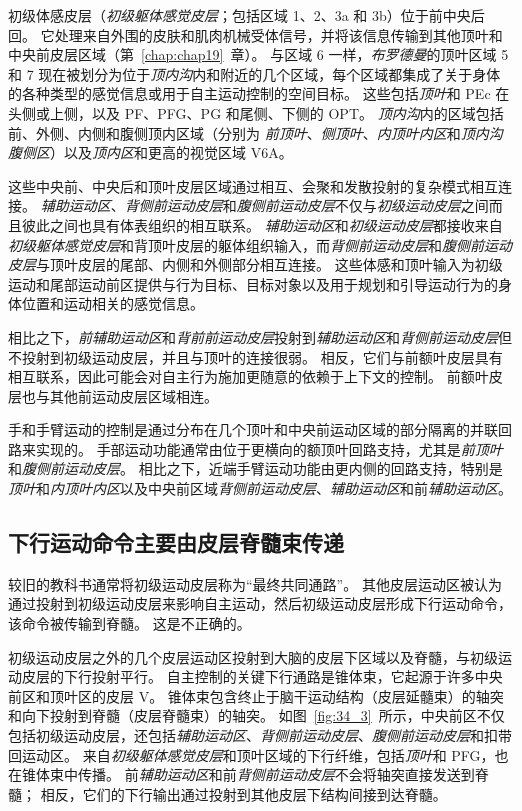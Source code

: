 初级体感皮层（\textit{初级躯体感觉皮层}；包括区域 1、2、3a 和 3b）位于前中央后回。
它处理来自外围的皮肤和肌肉机械受体信号，并将该信息传输到其他顶叶和中央前皮层区域（第~\ref{chap:chap19}~章）。
与区域 6 一样，\textit{布罗德曼}的顶叶区域 5 和 7 现在被划分为位于\textit{顶内沟}内和附近的几个区域，每个区域都集成了关于身体的各种类型的感觉信息或用于自主运动控制的空间目标。
这些包括\textit{顶叶}和 PEc 在头侧或上侧，以及 PF、PFG、PG 和尾侧、下侧的 OPT。
\textit{顶内沟}内的区域包括前、外侧、内侧和腹侧顶内区域（分别为 \textit{前顶叶}、\textit{侧顶叶}、\textit{内顶叶内区}和\textit{顶内沟腹侧区}）以及\textit{顶内区}和更高的视觉区域 V6A。


这些中央前、中央后和顶叶皮层区域通过相互、会聚和发散投射的复杂模式相互连接。
\textit{辅助运动区}、\textit{背侧前运动皮层}和\textit{腹侧前运动皮层}不仅与\textit{初级运动皮层}之间而且彼此之间也具有体表组织的相互联系。
\textit{辅助运动区}和\textit{初级运动皮层}都接收来自\textit{初级躯体感觉皮层}和背顶叶皮层的躯体组织输入，而\textit{背侧前运动皮层}和\textit{腹侧前运动皮层}与顶叶皮层的尾部、内侧和外侧部分相互连接。
这些体感和顶叶输入为初级运动和尾部运动前区提供与行为目标、目标对象以及用于规划和引导运动行为的身体位置和运动相关的感觉信息。


相比之下，\textit{前辅助运动区}和\textit{背前前运动皮层}投射到\textit{辅助运动区}和\textit{背侧前运动皮层}但不投射到初级运动皮层，并且与顶叶的连接很弱。
相反，它们与前额叶皮层具有相互联系，因此可能会对自主行为施加更随意的依赖于上下文的控制。
前额叶皮层也与其他前运动皮层区域相连。


手和手臂运动的控制是通过分布在几个顶叶和中央前运动区域的部分隔离的并联回路来实现的。
手部运动功能通常由位于更横向的额顶叶回路支持，尤其是\textit{前顶叶}和\textit{腹侧前运动皮层}。
相比之下，近端手臂运动功能由更内侧的回路支持，特别是\textit{顶叶}和\textit{内顶叶内区}以及中央前区域\textit{背侧前运动皮层}、\textit{辅助运动区}和前\textit{辅助运动区}。



\subsection{下行运动命令主要由皮层脊髓束传递}

较旧的教科书通常将初级运动皮层称为“最终共同通路”。
其他皮层运动区被认为通过投射到初级运动皮层来影响自主运动，然后初级运动皮层形成下行运动命令，该命令被传输到脊髓。
这是不正确的。


初级运动皮层之外的几个皮层运动区投射到大脑的皮层下区域以及脊髓，与初级运动皮层的下行投射平行。
自主控制的关键下行通路是锥体束，它起源于许多中央前区和顶叶区的皮层 V。
锥体束包含终止于脑干运动结构（皮层延髓束）的轴突和向下投射到脊髓（皮层脊髓束）的轴突。
如图~\ref{fig:34_3}~所示，中央前区不仅包括初级运动皮层，还包括\textit{辅助运动区}、\textit{背侧前运动皮层}、\textit{腹侧前运动皮层}和扣带回运动区。
来自\textit{初级躯体感觉皮层}和顶叶区域的下行纤维，包括\textit{顶叶}和 PFG，也在锥体束中传播。
前\textit{辅助运动区}和前\textit{背侧前运动皮层}不会将轴突直接发送到脊髓；
相反，它们的下行输出通过投射到其他皮层下结构间接到达脊髓。


